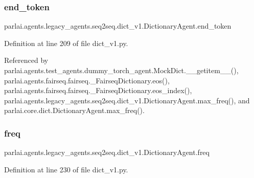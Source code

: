 \subsubsection{\texorpdfstring{end\+\_\+token}{end\_token}}
{\footnotesize\ttfamily parlai.\+agents.\+legacy\+\_\+agents.\+seq2seq.\+dict\+\_\+v1.\+Dictionary\+Agent.\+end\+\_\+token}



Definition at line 209 of file dict\+\_\+v1.\+py.



Referenced by parlai.\+agents.\+test\+\_\+agents.\+dummy\+\_\+torch\+\_\+agent.\+Mock\+Dict.\+\_\+\+\_\+getitem\+\_\+\+\_\+(), parlai.\+agents.\+fairseq.\+fairseq.\+\_\+\+Fairseq\+Dictionary.\+eos(), parlai.\+agents.\+fairseq.\+fairseq.\+\_\+\+Fairseq\+Dictionary.\+eos\+\_\+index(), parlai.\+agents.\+legacy\+\_\+agents.\+seq2seq.\+dict\+\_\+v1.\+Dictionary\+Agent.\+max\+\_\+freq(), and parlai.\+core.\+dict.\+Dictionary\+Agent.\+max\+\_\+freq().

\mbox{\label{classparlai_1_1agents_1_1legacy__agents_1_1seq2seq_1_1dict__v1_1_1DictionaryAgent_ac7b08374abe6efb8d1fdbb0885dc9b74}} 
\subsubsection{\texorpdfstring{freq}{freq}}
{\footnotesize\ttfamily parlai.\+agents.\+legacy\+\_\+agents.\+seq2seq.\+dict\+\_\+v1.\+Dictionary\+Agent.\+freq}



Definition at line 230 of file dict\+\_\+v1.\+py.



